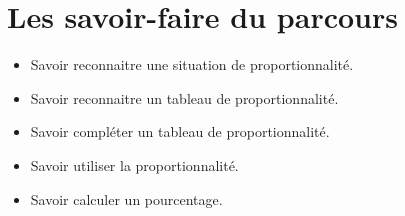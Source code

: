 \documentclass[a4paper,dvipsnames]{article}
\begin{document}
\section{Les savoir-faire du parcours}

\begin{CpsCol}
\begin{itemize}
\item Savoir reconnaitre une situation de proportionnalité.
\item Savoir reconnaitre un tableau de proportionnalité.
\item Savoir compléter un tableau de proportionnalité.
\item Savoir utiliser la proportionnalité.
\item Savoir calculer un pourcentage.
\end{itemize}
\end{CpsCol}
\end{document}
